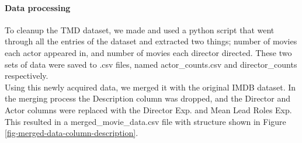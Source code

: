     \paragraph{Data processing}
        To cleanup the TMD dataset, we made and used a python script that went through all the entries of
            the dataset and extracted two things; number of movies each actor appeared in, and number of movies each director
            directed.
        These two sets of data were saved to .csv files, named actor\_counts.csv and director\_counts respectively.
        \\
        Using this newly acquired data, we merged it with the original IMDB dataset. 
        In the merging process the Description column was dropped, and the Director and Actor columns were replaced with the 
            Director Exp. and Mean Lead Roles Exp.
        This resulted in a merged\_movie\_data.csv file with structure shown in Figure \ref*{fig-merged-data-column-description}.
